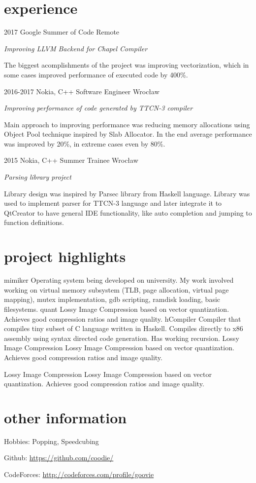 \documentclass[]{twentysecondcv}
\begin{document}

\section{experience}

\begin{twenty}
  \twentyitem
    {2017}
    {Google Summer of Code}
    {Remote}
    {
    \emph{Improving LLVM Backend for Chapel Compiler}
    
    The biggest acomplishments of the project was improving vectorization, which in some cases improved performance of executed code by 400\%. }
  \twentyitem
    {2016-2017}
    {Nokia, C++ Software Engineer}
    {Wrocław}
    {
    \emph{Improving performance of code generated by TTCN-3 compiler}
    
     Main approach to improving performance was reducing memory allocations using Object Pool technique inspired by Slab Allocator. In the end average performance was improved by 20\%, in extreme cases even by 80\%. }
\twentyitem
    {2015}
    {Nokia, C++ Summer Trainee}
    {Wrocław}
    {
    \emph{Parsing library project}
    
     Library design was inspired by Parsec library from Haskell language. Library was used to implement parser for TTCN-3 language and later integrate it to QtCreator to have general IDE functionality, like auto completion and jumping to function definitions. }

\end{twenty}

\section{project highlights}
\begin{twenty}
	\twentyitem
	{}
	{mimiker}
	{}
	{ Operating system being developed on university. My work involved working on virtual memory subsystem (TLB, page allocation, virtual page mapping), mutex implementation, gdb scripting, ramdisk loading, basic filesystems. }
	\twentyitem
	{}
	{quant}
	{}
	{Lossy Image Compression based on vector quantization. Achieves good compression ratios and image quality.}
	\twentyitem
	{}
	{hCompiler}
	{}
	{Compiler that compiles tiny subset of C language written in Haskell. Compiles directly to x86 assembly using syntax directed code generation. Has working recursion. }
	\twentyitem
	{}
	{Lossy Image Compression}
	{}
	{Lossy Image Compression based on vector quantization. Achieves good compression ratios and image quality.}

		\twentyitem
	{}
	{Lossy Image Compression}
	{}
	{Lossy Image Compression based on vector quantization. Achieves good compression ratios and image quality.}
\end{twenty}


\section{other information}
Hobbies: Popping, Speedcubing

Github: \url{https://github.com/coodie/}

CodeForces: \url{http://codeforces.com/profile/goovie}


\end{document}
